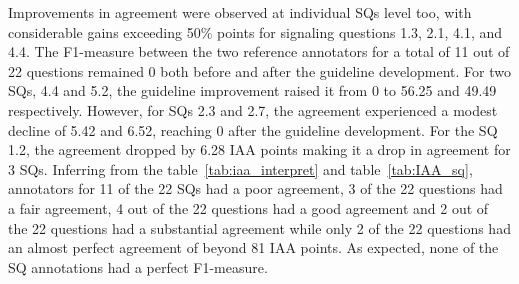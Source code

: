 \documentclass[sn-mathphys,Numbered]{sn-jnl}%
\theoremstyle{thmstyleone}%
\theoremstyle{thmstyletwo}%
\theoremstyle{thmstylethree}%
\begin{document}
Improvements in agreement were observed at individual SQs level too, with considerable gains exceeding 50\% points for signaling questions 1.3, 2.1, 4.1, and 4.4.
The F1-measure between the two reference annotators for a total of 11 out of 22 questions remained 0 both before and after the guideline development.
For two SQs, 4.4 and 5.2, the guideline improvement raised it from 0 to 56.25 and 49.49 respectively.
However, for SQs 2.3 and 2.7, the agreement experienced a modest decline of 5.42 and 6.52, reaching 0 after the guideline development.
For the SQ 1.2, the agreement dropped by 6.28 IAA points making it a drop in agreement for 3 SQs.
Inferring from the table~\ref{tab:iaa_interpret} and table~\ref{tab:IAA_sq}, annotators for 11 of the 22 SQs had a poor agreement, 3 of the 22 questions had a fair agreement, 4 out of the 22 questions had a good agreement and 2 out of the 22 questions had a substantial agreement while only 2 of the 22 questions had an almost perfect agreement of beyond 81 IAA points.
As expected, none of the SQ annotations had a perfect F1-measure.
%
%
%
\end{document}
